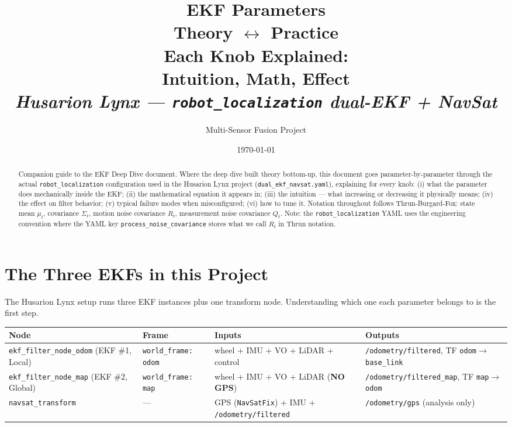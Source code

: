 \documentclass[11pt,a4paper]{article}
\title{\Huge\bfseries EKF Parameters\\[0.4em]\Large Theory $\leftrightarrow$ Practice\\[0.3em]\large Each Knob Explained:\\Intuition, Math, Effect\\[0.5em]\normalsize\itshape Husarion Lynx --- \texttt{robot\_localization} dual-EKF + NavSat}
\author{Multi-Sensor Fusion Project}
\date{\today}
\begin{document}
\maketitle

\begin{abstract}
\noindent Companion guide to the EKF Deep Dive document. Where the deep dive built theory bottom-up, this document goes parameter-by-parameter through the actual \texttt{robot\_localization} configuration used in the Husarion Lynx project (\texttt{dual\_ekf\_navsat.yaml}), explaining for every knob: (i) what the parameter does mechanically inside the EKF; (ii) the mathematical equation it appears in; (iii) the intuition --- what increasing or decreasing it physically means; (iv) the effect on filter behavior; (v) typical failure modes when misconfigured; (vi) how to tune it. Notation throughout follows Thrun-Burgard-Fox: state mean $\mu_t$, covariance $\Sigma_t$, motion noise covariance $R_t$, measurement noise covariance $Q_t$. Note: the \texttt{robot\_localization} YAML uses the engineering convention where the YAML key \texttt{process\_noise\_covariance} stores what we call $R_t$ in Thrun notation.
\end{abstract}

\tableofcontents
\newpage

\section{The Three EKFs in this Project}

The Husarion Lynx setup runs three EKF instances plus one transform node. Understanding which one each parameter belongs to is the first step.

\begin{center}
\footnotesize
\begin{tabular}{p{3.2cm} p{2.0cm} p{4.5cm} p{3.5cm}}
\toprule
\textbf{Node} & \textbf{Frame} & \textbf{Inputs} & \textbf{Outputs} \\
\midrule
\texttt{ekf\_filter\_node\_odom} (EKF \#1, Local) & \texttt{world\_frame: odom} & wheel + IMU + VO + LiDAR + control & \texttt{/odometry/filtered}, TF \texttt{odom}$\to$\texttt{base\_link} \\
\texttt{ekf\_filter\_node\_map} (EKF \#2, Global) & \texttt{world\_frame: map} & wheel + IMU + VO + LiDAR (\textbf{NO GPS}) & \texttt{/odometry/filtered\_map}, TF \texttt{map}$\to$\texttt{odom} \\
\texttt{navsat\_transform} & --- & GPS (\texttt{NavSatFix}) + IMU + \texttt{/odometry/filtered} & \texttt{/odometry/gps} (analysis only) \\
\bottomrule
\end{tabular}
\end{center}
\end{document}
